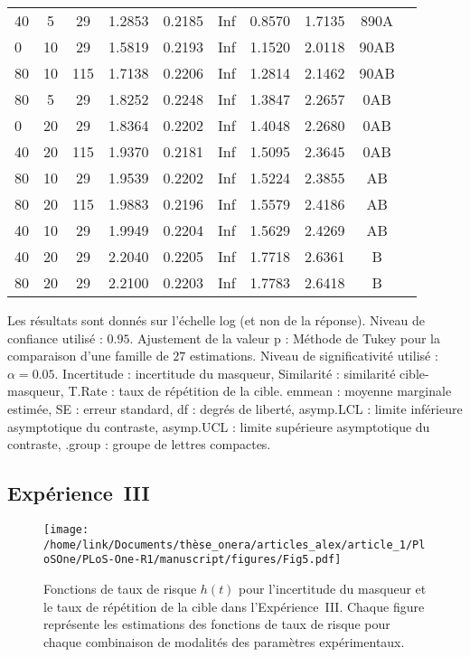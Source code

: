 \begin{table}[!t]
\begin{tabular}{|l|*{9}{c|}}
40 & 5 & 29 & 1.2853 & 0.2185 & Inf & 0.8570 & 1.7135 & 890A \\ 
0 & 10 & 29 & 1.5819 & 0.2193 & Inf & 1.1520 & 2.0118 & 90AB \\ 
80 & 10 & 115 & 1.7138 & 0.2206 & Inf & 1.2814 & 2.1462 & 90AB \\ 
80 & 5 & 29 & 1.8252 & 0.2248 & Inf & 1.3847 & 2.2657 & 0AB \\ 
0 & 20 & 29 & 1.8364 & 0.2202 & Inf & 1.4048 & 2.2680 & 0AB \\ 
40 & 20 & 115 & 1.9370 & 0.2181 & Inf & 1.5095 & 2.3645 & 0AB \\ 
80 & 10 & 29 & 1.9539 & 0.2202 & Inf & 1.5224 & 2.3855 & AB \\ 
80 & 20 & 115 & 1.9883 & 0.2196 & Inf & 1.5579 & 2.4186 & AB \\ 
40 & 10 & 29 & 1.9949 & 0.2204 & Inf & 1.5629 & 2.4269 & AB \\ 
40 & 20 & 29 & 2.2040 & 0.2205 & Inf & 1.7718 & 2.6361 & B \\ 
80 & 20 & 29 & 2.2100 & 0.2203 & Inf & 1.7783 & 2.6418 & B \\ 
\hline
\end{tabular}
\smallskip
\begin{flushleft}
Les résultats sont donnés sur l'échelle log (et non de la réponse). 
Niveau de confiance utilisé : $0.95$. 
Ajustement de la valeur p : Méthode de Tukey pour la comparaison d'une famille de $27$ estimations. 
Niveau de significativité utilisé : $\alpha = 0.05$. 
Incertitude : incertitude du masqueur, Similarité : similarité cible-masqueur, T.Rate : taux de répétition de la cible. emmean : moyenne marginale estimée, SE : erreur standard, df : degrés de liberté, asymp.LCL : limite inférieure asymptotique du contraste, asymp.UCL : limite supérieure asymptotique du contraste, .group : groupe de lettres compactes.
\end{flushleft}
\end{table}

\subsection{Expérience~III}
\label{chapitre4resultatsexpIII}

\begin{figure}[!t]
\texttt{[image: /home/link/Documents/thèse\_onera/articles\_alex/article\_1/PloSOne/PLoS-One-R1/manuscript/figures/Fig5.pdf]}
\caption[Fonctions de taux de risque $h(t)$ pour l'Expérience~III]{Fonctions de taux de risque $h(t)$ pour l'incertitude du masqueur et le taux de répétition de la cible dans l'Expérience~III. 
Chaque figure représente les estimations des fonctions de taux de risque pour chaque combinaison de modalités des paramètres expérimentaux.} 
\label{fig:hr_Exp-III} 
\end{figure}

